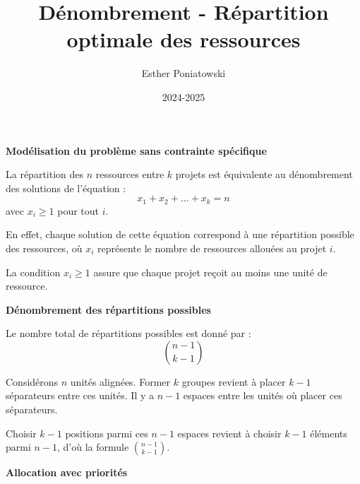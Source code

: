 \documentclass[10pt,a4paper]{article}
\title{Dénombrement - Répartition optimale des ressources}
\author{Esther Poniatowski}
\date{2024-2025}
\begin{document}
\q \textbf{Modélisation du problème sans contrainte spécifique}

La répartition des $ n $ ressources entre $ k $ projets est équivalente au dénombrement des
solutions de l'équation :
$$
x_1 + x_2 + \dots + x_k = n
$$
avec $ x_i \geq 1 $ pour tout $ i $.

En effet, chaque solution de cette équation correspond à une répartition possible des ressources, où
$ x_i $ représente le nombre de ressources allouées au projet $ i $.

La condition $ x_i \geq 1$ assure que chaque projet reçoit au moins une unité de ressource.

\q \textbf{Dénombrement des répartitions possibles}

Le nombre total de répartitions possibles est donné par :
$$
\binom{n-1}{k-1}
$$

Considérons $ n $ unités alignées. Former $ k $ groupes revient à placer $ k-1 $ séparateurs
entre ces unités. Il y a $ n-1 $ espaces entre les unités où placer ces séparateurs.

Choisir $ k-1 $ positions parmi ces $ n-1 $ espaces revient à choisir $ k-1$ éléments parmi
$n-1 $, d'où la formule $ \binom{n-1}{k-1} $.

\q \textbf{Allocation avec priorités}
\end{document}
